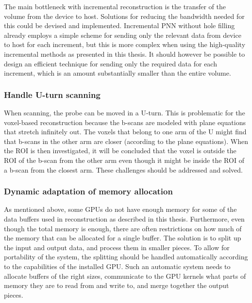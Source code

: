 	The main bottleneck with incremental reconstruction is the transfer of the volume from the device to host. Solutions for reducing the bandwidth needed for this could be devised and implemented. Incremental PNN without hole filling already employs a simple scheme for sending only the relevant data from device to host for each increment, but this is more complex when using the high-quality incremental methods as presented in this thesis. It should however be possible to design an efficient technique for sending only the required data for each increment, which is an amount substantially smaller than the entire volume.
	
\subsubsection{Handle U-turn scanning}

	When scanning, the probe can be moved in a U-turn. This is problematic for the voxel-based reconstruction because the b-scans are modeled with plane equations that stretch infinitely out. The voxels that belong to one arm of the U might find that b-scans in the other arm are closer (according to the plane equations). When the ROI is then investigated, it will be concluded that the voxel is outside the ROI of the b-scan from the other arm even though it might be inside the ROI of a b-scan from the closest arm. These challenges should be addressed and solved.
	
\subsubsection{Dynamic adaptation of memory allocation}

	As mentioned above, some GPUs do not have enough memory for some of the data buffers used in reconstruction as described in this thesis. Furthermore, even though the total memory is enough, there are often restrictions on how much of the memory that can be allocated for a single buffer. The solution is to split up the input and output data, and process them in smaller pieces. To allow for portability of the system, the splitting should be handled automatically according to the capabilities of the installed GPU. Such an automatic system needs to allocate buffers of the right sizes, communicate to the GPU kernels what parts of memory they are to read from and write to, and merge together the output pieces.